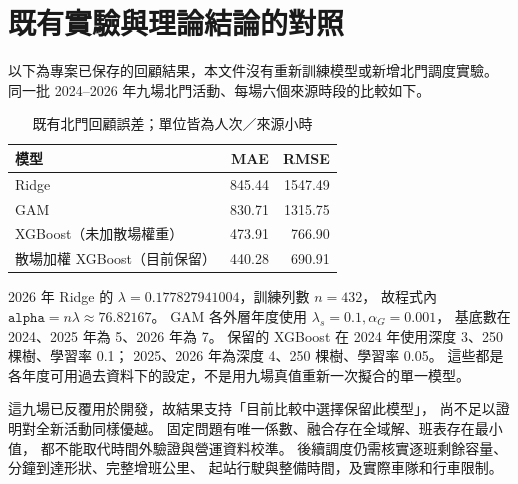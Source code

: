 \section{既有實驗與理論結論的對照}

以下為專案已保存的回顧結果，本文件沒有重新訓練模型或新增北門調度實驗。
同一批 2024--2026 年九場北門活動、每場六個來源時段的比較如下。
\begin{table}[htbp]
\centering
\caption{既有北門回顧誤差；單位皆為人次／來源小時}
\begin{tabular}{@{}lrr@{}}
\toprule
模型 & MAE & RMSE\\
\midrule
Ridge &845.44&1547.49\\
GAM &830.71&1315.75\\
XGBoost（未加散場權重） &473.91&766.90\\
散場加權 XGBoost（目前保留） &440.28&690.91\\
\bottomrule
\end{tabular}
\end{table}

2026 年 Ridge 的 $\lambda=0.177827941004$，訓練列數 $n=432$，
故程式內 $\texttt{alpha}=n\lambda\approx76.82167$。
GAM 各外層年度使用 $\lambda_s=0.1,\alpha_G=0.001$，
基底數在 2024、2025 年為 5、2026 年為 7。
保留的 XGBoost 在 2024 年使用深度 3、250 棵樹、學習率 0.1；
2025、2026 年為深度 4、250 棵樹、學習率 0.05。
這些都是各年度可用過去資料下的設定，不是用九場真值重新一次擬合的單一模型。

這九場已反覆用於開發，故結果支持「目前比較中選擇保留此模型」，
尚不足以證明對全新活動同樣優越。
固定問題有唯一係數、融合存在全域解、班表存在最小值，
都不能取代時間外驗證與營運資料校準。
後續調度仍需核實逐班剩餘容量、分鐘到達形狀、完整增班公里、
起站行駛與整備時間，及實際車隊和行車限制。
